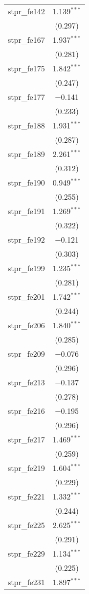 \begin{table}[!htbp]
\begin{tabular}{@{\extracolsep{5pt}}lc}
  stpr\_fe142 & 1.139$^{***}$ \\ 
  & (0.297) \\ 
  stpr\_fe167 & 1.937$^{***}$ \\ 
  & (0.281) \\ 
  stpr\_fe175 & 1.842$^{***}$ \\ 
  & (0.247) \\ 
  stpr\_fe177 & $-$0.141 \\ 
  & (0.233) \\ 
  stpr\_fe188 & 1.931$^{***}$ \\ 
  & (0.287) \\ 
  stpr\_fe189 & 2.261$^{***}$ \\ 
  & (0.312) \\ 
  stpr\_fe190 & 0.949$^{***}$ \\ 
  & (0.255) \\ 
  stpr\_fe191 & 1.269$^{***}$ \\ 
  & (0.322) \\ 
  stpr\_fe192 & $-$0.121 \\ 
  & (0.303) \\ 
  stpr\_fe199 & 1.235$^{***}$ \\ 
  & (0.281) \\ 
  stpr\_fe201 & 1.742$^{***}$ \\ 
  & (0.244) \\ 
  stpr\_fe206 & 1.840$^{***}$ \\ 
  & (0.285) \\ 
  stpr\_fe209 & $-$0.076 \\ 
  & (0.296) \\ 
  stpr\_fe213 & $-$0.137 \\ 
  & (0.278) \\ 
  stpr\_fe216 & $-$0.195 \\ 
  & (0.296) \\ 
  stpr\_fe217 & 1.469$^{***}$ \\ 
  & (0.259) \\ 
  stpr\_fe219 & 1.604$^{***}$ \\ 
  & (0.229) \\ 
  stpr\_fe221 & 1.332$^{***}$ \\ 
  & (0.244) \\ 
  stpr\_fe225 & 2.625$^{***}$ \\ 
  & (0.291) \\ 
  stpr\_fe229 & 1.134$^{***}$ \\ 
  & (0.225) \\ 
  stpr\_fe231 & 1.897$^{***}$ \\ 

\end{tabular}
\end{table}

